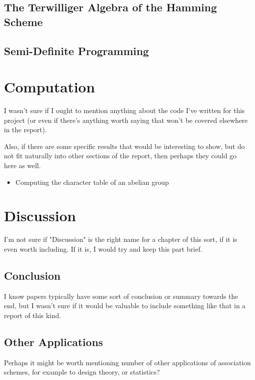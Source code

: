 \documentclass{report}
\begin{document}
  \section{The Terwilliger Algebra of the Hamming Scheme}

  \section{Semi-Definite Programming}

\chapter{Computation}
  I wasn't sure if I ought to mention anything about the code I've written for
  this project (or even if there's anything worth saying that won't be covered
  elsewhere in the report).

  Also, if there are some specific results that would be interesting to show,
  but do not fit naturally into other sections of the report, then perhaps they
  could go here as well.

  \begin{itemize}
    \item Computing the character table of an abelian group
  \end{itemize}

\chapter{Discussion}
  I'm not sure if "Discussion" is the right name for a chapter of this sort, if
  it is even worth including.  If it is, I would try and keep this part brief.

  \section{Conclusion}
    I know papers typically have some sort of conclusion or summary towards the
    end, but I wasn't sure if it would be valuable to include something like
    that in a report of this kind.

  \section{Other Applications}
    Perhaps it might be worth mentioning number of other applications of
    association schemes, for example to design theory, or statistics?

\appendix
\end{document}
